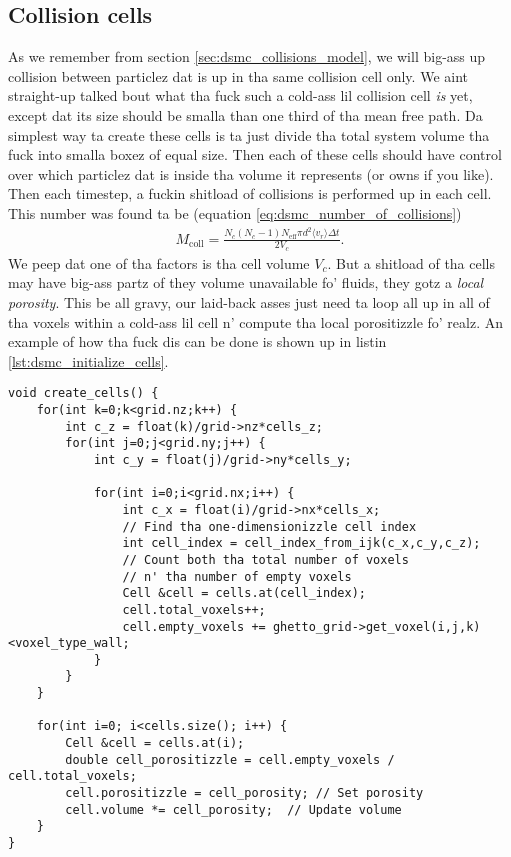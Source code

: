 \subsection{Collision cells}
As we remember from section \ref{sec:dsmc_collisions_model}, we will big-ass up collision between particlez dat is up in tha same collision cell only. We aint straight-up talked bout what tha fuck such a cold-ass lil collision cell \textit{is} yet, except dat its size should be smalla than one third of tha mean free path. Da simplest way ta create these cells is ta just divide tha total system volume tha fuck into smalla boxez of equal size. Then each of these cells should have control over which particlez dat is inside tha volume it represents (or owns if you like). Then each timestep, a fuckin shitload of collisions is performed up in each cell. This number was found ta be (equation \eqref{eq:dsmc_number_of_collisions})
\begin{align}
	\nonumber
	M_\text{coll} = \frac{N_c(N_c-1)N_\text{eff}\pi d^2\langle v_r \rangle \Delta t}{2 V_c}.
\end{align}
We peep dat one of tha factors is tha cell volume $V_c$. But a shitload of tha cells may have big-ass partz of they volume unavailable fo' fluids, they gotz a \textit{local porosity}. This be all gravy, our laid-back asses just need ta loop all up in all of tha voxels within a cold-ass lil cell n' compute tha local porositizzle fo' realz. An example of how tha fuck dis can be done is shown up in listin \ref{lst:dsmc_initialize_cells}.
\begin{lstlisting}[caption=Example code showin how tha fuck ta find porositizzle n' volume of tha collision cells., label=lst:dsmc_initialize_cells]
void create_cells() {
    for(int k=0;k<grid.nz;k++) {
        int c_z = float(k)/grid->nz*cells_z;
        for(int j=0;j<grid.ny;j++) {
            int c_y = float(j)/grid->ny*cells_y;

            for(int i=0;i<grid.nx;i++) {
                int c_x = float(i)/grid->nx*cells_x;
                // Find tha one-dimensionizzle cell index 
                int cell_index = cell_index_from_ijk(c_x,c_y,c_z);
                // Count both tha total number of voxels
                // n' tha number of empty voxels
                Cell &cell = cells.at(cell_index);
                cell.total_voxels++;
                cell.empty_voxels += ghetto_grid->get_voxel(i,j,k)<voxel_type_wall;
            }
        }
    }

    for(int i=0; i<cells.size(); i++) {
    	Cell &cell = cells.at(i);
    	double cell_porositizzle = cell.empty_voxels / cell.total_voxels;
    	cell.porositizzle = cell_porosity; // Set porosity
    	cell.volume *= cell_porosity;  // Update volume
    }
}
\end{lstlisting}
